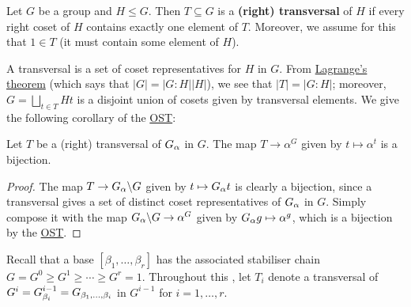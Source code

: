  

\begin{definition}\label{def:transversal}
    Let $G$ be a group and $H \leq G$. Then $T \subseteq G$ is a \textbf{(right) transversal} of $H$ if every right coset of $H$ contains exactly one element of $T$. Moreover, we assume  for this \thesis{} that $1 \in T$ (it must contain some element of $H$).
\end{definition}

A transversal is a set of coset representatives for $H$ in $G$. From \hyperref[thm:lagrange]{Lagrange's theorem} (which says that $|G| = |G : H| |H|$), we see that $|T| = |G : H|$; moreover, $G = \bigsqcup_{t \in T} Ht$ is a disjoint union of cosets given by transversal elements. We give the following corollary of the \hyperref[thm:orbit_stabiliser]{OST}:

\begin{corollary}\label{cor:orbit_stabiliser_transversal}
    Let $T$ be a (right) transversal of $\added{2}{G_\alpha}$ in $G$. The map $T \to \alpha^G$ given by $t \mapsto \alpha^t$ is a bijection.
\end{corollary}

\begin{proof}
    The map $T \to \added{2}{G_\alpha} \backslash G$ given by $t \mapsto \added{2}{G_\alpha}t$ is clearly a bijection, since a transversal gives a set of distinct coset representatives of $\added{2}{G_\alpha}$ in $G$. Simply compose it with the map $\added{2}{G_\alpha} \backslash G \to \alpha^G$ given by $\added{2}{G_\alpha}g \mapsto \alpha^g$, which is a bijection by the \hyperref[thm:orbit_stabiliser]{OST}.
\end{proof}

 Recall that a base $[\beta_1,\dotsc,\beta_r]$ has the associated stabiliser chain $G = G^0 \geq G^1 \geq \dotsb \geq G^r = 1$. Throughout this \thesis{}, let $T_i$ denote a transversal of $G^i = \added{2}{G^{i-1}_{\beta_i}} = \added{2}{G_{\beta_1,\dotsc,\beta_i}}$ in $G^{i-1}$ for $i = 1,\dotsc,r$. 

